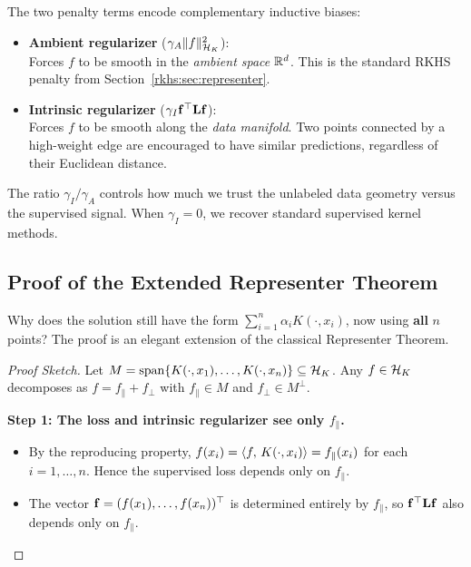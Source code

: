 \begin{notechapter}
\begin{insightbox}
The two penalty terms encode complementary inductive biases:

\begin{itemize}
  \item \textbf{Ambient regularizer} ($\gamma_A\| f \|_{\mathcal{H}_K}^2$): \\
  Forces $f$ to be smooth in the \emph{ambient space} $\mathbb{R}^d$. This is 
  the standard RKHS penalty from Section~\ref{rkhs:sec:representer}.

  \item \textbf{Intrinsic regularizer} ($\gamma_I \mathbf{f}^\top \mathbf{L} \mathbf{f}$): \\
  Forces $f$ to be smooth along the \emph{data manifold}. Two points 
  connected by a high-weight edge are encouraged to have similar 
  predictions, regardless of their Euclidean distance.
\end{itemize}

The ratio $\gamma_I / \gamma_A$ controls how much we trust the 
unlabeled data geometry versus the supervised signal. When 
$\gamma_I = 0$, we recover standard supervised kernel methods.
\end{insightbox}

\subsection{Proof of the Extended Representer Theorem}
\label{rkhs:subsec:manifold_representer_proof}

Why does the solution still have the form $\sum_{i=1}^n \alpha_i 
K(\cdot, x_i)$, now using \textbf{all} $n$ points? The proof is an 
elegant extension of the classical Representer Theorem.

\begin{proof}[Proof Sketch]
Let $M = \operatorname{span}\{K(\cdot, x_1), \ldots, K(\cdot, x_n)\} \subseteq \mathcal{H}_K$. 
Any $f \in \mathcal{H}_K$ decomposes as $f = f_\parallel + f_\perp$ with 
$f_\parallel \in M$ and $f_\perp \in M^\perp$.

\smallskip
\textbf{Step 1: The loss and intrinsic regularizer see only $f_\parallel$.}
\begin{itemize}
  \item By the reproducing property, $f(x_i) = \langle f,\, K(\cdot, x_i) \rangle 
    = f_\parallel(x_i)$ for each $i = 1,\ldots,n$. Hence the supervised 
    loss depends only on $f_\parallel$.
  \item The vector $\mathbf{f} = (f(x_1),\ldots,f(x_n))^\top$ is determined 
    entirely by $f_\parallel$, so $\mathbf{f}^\top \mathbf{L} \mathbf{f}$ also 
    depends only on $f_\parallel$.
\end{itemize}


\end{proof}
\end{notechapter}
